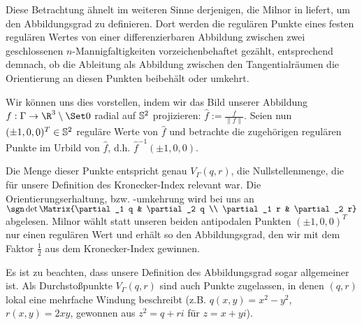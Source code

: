 \documentclass{mythesis}
\begin{document}
Diese Betrachtung ähnelt im weiteren Sinne derjenigen, die Milnor in \cite[§5]{milnor1997topology} liefert, um den Abbildungsgrad zu definieren.
Dort werden die regulären Punkte eines festen regulären Wertes von einer differenzierbaren Abbildung zwischen zwei geschlossenen $n$-Mannigfaltigkeiten vorzeichenbehaftet gezählt, entsprechend demnach, ob die Ableitung als Abbildung zwischen den Tangentialräumen die Orientierung an diesen Punkten beibehält oder umkehrt.

Wir können uns dies vorstellen, indem wir das Bild unserer Abbildung $f: \Gamma \to \R^3 \setminus \Set 0$ radial auf $\S^2$ projizieren: $\hat f := \frac{f}{\|f\|}$.
Seien nun $(\pm 1,0,0)^T \in \S^2$ reguläre Werte von $\hat f$ und betrachte die zugehörigen regulären Punkte im Urbild von $\hat f$, d.h. $\hat f^{-1}(\pm 1, 0, 0)$.

Die Menge dieser Punkte entspricht genau $V_\Gamma(q,r)$, die Nullstellenmenge, die für unsere Definition des Kronecker-Index relevant war.
Die Orientierungserhaltung, bzw. -umkehrung wird bei uns an $\sgn \det \Matrix{\partial_1 q & \partial_2 q \\ \partial_1 r & \partial_2 r}$ abgelesen.
Milnor wählt statt unseren beiden antipodalen Punkten $(\pm 1,0,0)^T$ nur einen regulären Wert und erhält so den Abbildungsgrad, den wir mit dem Faktor $\frac{1}{2}$ aus dem Kronecker-Index gewinnen.

Es ist zu beachten, dass unsere Definition des Abbildungsgrad sogar allgemeiner ist.
Als Durchstoßpunkte $V_\Gamma(q,r)$ sind auch Punkte zugelassen, in denen $(q,r)$ lokal eine mehrfache Windung beschreibt (z.B. $q(x,y) = x^2 - y^2$, $r(x,y) = 2xy$, gewonnen aus $z^2 = q + ri$ für $z = x + yi$).









\end{document}
